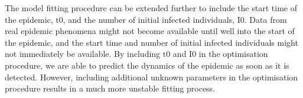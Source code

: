 The model fitting procedure can be extended further to include the
start time of the epidemic, t0, and the number of initial infected
individuals, I0. Data from real epidemic phenomena might not become
available until well into the start of the epidemic, and the start
time and number of initial infected individuals might not immediately
be available. By including t0 and I0 in the optimisation procedure, we
are able to predict the dynamics of the epidemic as soon as it is
detected. However, including additional unknown parameters in the
optimisation procedure results in a much more unstable fitting
process.  
